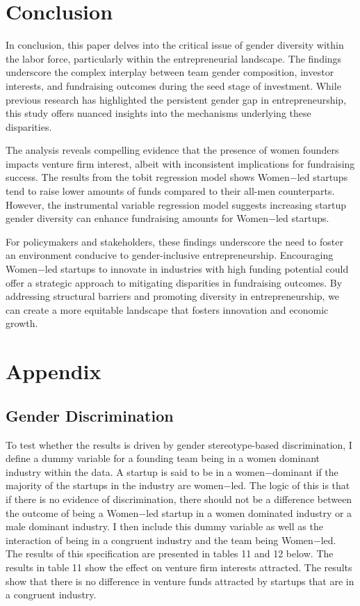 \section{Conclusion} \label{sec:conclusion}

In conclusion, this paper delves into the critical issue of gender diversity within the labor force, particularly within the entrepreneurial landscape. The findings underscore the complex interplay between team gender composition, investor interests, and fundraising outcomes during the seed stage of investment. While previous research has highlighted the persistent gender gap in entrepreneurship, this study offers nuanced insights into the mechanisms underlying these disparities.

The analysis reveals compelling evidence that the presence of women founders impacts venture firm interest, albeit with inconsistent implications for fundraising success. The results from the tobit regression model shows Women$-$led startups tend to raise lower amounts of funds compared to their all-men counterparts. However, the instrumental variable regression model suggests increasing startup gender diversity can enhance fundraising amounts for Women$-$led startups.


For policymakers and stakeholders, these findings underscore the need to foster an environment conducive to gender-inclusive entrepreneurship. Encouraging Women$-$led startups to innovate in industries with high funding potential could offer a strategic approach to mitigating disparities in fundraising outcomes. By addressing structural barriers and promoting diversity in entrepreneurship, we can create a more equitable landscape that fosters innovation and economic growth.





\section{Appendix} \label{sec:Appendix}


\subsection{Gender Discrimination}
To test whether the results is driven by gender stereotype-based discrimination, I define a dummy variable for a founding team being in a women dominant industry within the data. A startup is said to be in a women$-$dominant if the majority of the startups in the industry are women$-$led. The logic of this is that if there is no evidence of discrimination, there should not be a difference between the outcome of being a Women$-$led startup in a women dominated industry or a male dominant industry. I then include this dummy variable as well as the interaction of being in a congruent industry and the team being Women$-$led. The results of this specification are presented in tables 11 and 12 below. The results in table 11 show the effect on venture firm interests attracted. The results show that there is no difference in venture funds attracted by startups that are in a congruent industry.  

